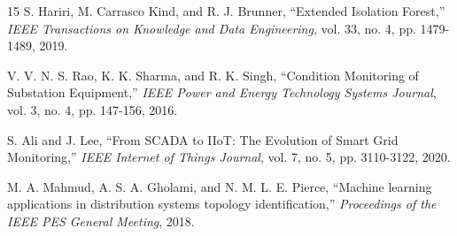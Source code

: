 \documentclass[12pt, a4paper]{article}
\begin{document}
\begin{thebibliography}{15}
S. Hariri, M. Carrasco Kind, and R. J. Brunner, ``Extended Isolation Forest,'' \emph{IEEE Transactions on Knowledge and Data Engineering}, vol. 33, no. 4, pp. 1479-1489, 2019.

V. V. N. S. Rao, K. K. Sharma, and R. K. Singh, ``Condition Monitoring of Substation Equipment,'' \emph{IEEE Power and Energy Technology Systems Journal}, vol. 3, no. 4, pp. 147-156, 2016.

S. Ali and J. Lee, ``From SCADA to IIoT: The Evolution of Smart Grid Monitoring,'' \emph{IEEE Internet of Things Journal}, vol. 7, no. 5, pp. 3110-3122, 2020. 

M. A. Mahmud, A. S. A. Gholami, and N. M. L. E. Pierce, ``Machine learning applications in distribution systems topology identification,'' \emph{Proceedings of the IEEE PES General Meeting}, 2018.

\end{thebibliography}
\end{document}
